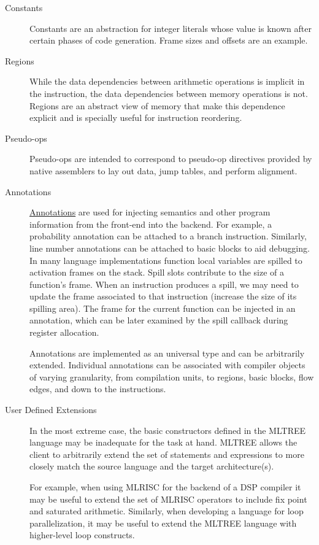   \begin{description} 
    \item[Constants] Constants are an
    abstraction for integer literals whose value is known after
    certain phases of code generation. Frame sizes and offsets are an
    example.  
    \item[Regions] While the data
    dependencies between arithmetic operations is implicit in the
    instruction, the data dependencies between memory operations is
    not. Regions are an abstract view of memory that make this
    dependence explicit and is specially useful for instruction
    reordering. 

    \item[Pseudo-ops] Pseudo-ops are
    intended to correspond to pseudo-op directives provided by native
    assemblers to lay out data, jump tables, and perform alignment.

    \item[Annotations]
    \href{annotations.html}{Annotations} are used
    for injecting semantics and other program information from the front-end 
    into the backend.  For example, a probability annotation can be
    attached to a branch instruction.  Similarly, line number annotations
    can be attached to basic blocks to aid debugging.   
    In many language implementations function local variables are
    spilled to activation frames on the stack. Spill slots contribute
    to the size of a function's frame. When an instruction produces a
    spill, we may need to update the frame associated to that
    instruction (increase the size of its spilling area). The frame
    for the current function can be injected in an annotation, which
    can be later examined by the spill callback during register allocation. 

     Annotations are
    implemented as an universal type and can be arbitrarily extended.
    Individual annotations can be associated
    with compiler objects of varying granularity, 
    from compilation units, to regions, basic blocks, flow edges,
    and down to the instructions.


    \item[User Defined Extensions]
    In the most extreme case, the basic constructors defined in the MLTREE
    language may be inadequate for the task at hand.  
    MLTREE allows the client to arbitrarily extend
    the set of statements and expressions to more closely match the
    source language and the target architecture(s). 
    
     For example, when using MLRISC for the backend of a DSP compiler 
     it may be useful to extend the set of MLRISC operators to include 
     fix point and saturated arithmetic.  
     Similarly, when developing a language for loop parallelization, it may
     be useful to extend the MLTREE language with higher-level loop 
     constructs.
  \end{description} 

